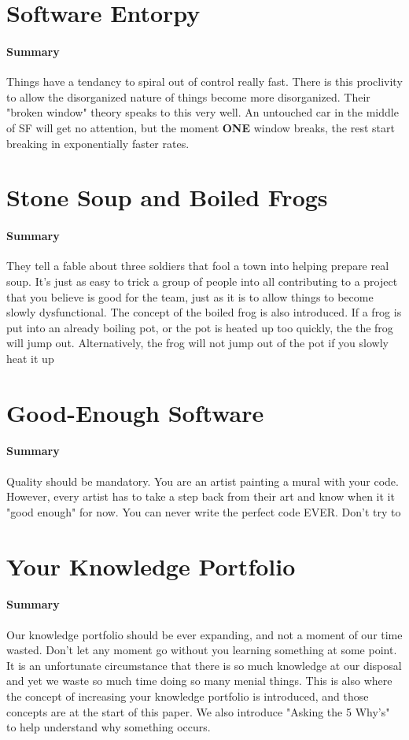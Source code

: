 \documentclass{article}
\begin{document}
\section{Software Entorpy}
    \paragraph{Summary}
    Things have a tendancy to spiral out of control really fast. There is this proclivity to allow the disorganized nature of things become more disorganized. Their "broken window" theory speaks to this very well. An untouched car in the middle of SF will get no attention, but the moment \textbf{ONE} window breaks, the rest start breaking in exponentially faster rates.

\section{Stone Soup and Boiled Frogs}
    \paragraph{Summary}
    They tell a fable about three soldiers that fool a town into helping prepare real soup. It's just as easy to trick a group of people into all contributing to a project that you believe is good for the team, just as it is to allow things to become slowly dysfunctional. The concept of the boiled frog is also introduced. If a frog is put into an already boiling pot, or the pot is heated up too quickly, the the frog will jump out. Alternatively, the frog will not jump out of the pot if you slowly heat it up

\section{Good-Enough Software}
    \paragraph{Summary}
    Quality should be mandatory. You are an artist painting a mural with your code. However, every artist has to take a step back from their art and know when it it "good enough" for now. You can never write the perfect code EVER. Don't try to

\section{Your Knowledge Portfolio}
    \paragraph{Summary}
    Our knowledge portfolio should be ever expanding, and not a moment of our time wasted. Don't let any moment go without you learning something at some point. It is an unfortunate circumstance that there is so much knowledge at our disposal and yet we waste so much time doing so many menial things. This is also where the concept of increasing your knowledge portfolio is introduced, and those concepts are at the start of this paper. We also introduce "Asking the 5 Why's" to help understand why something occurs.
\end{document}
